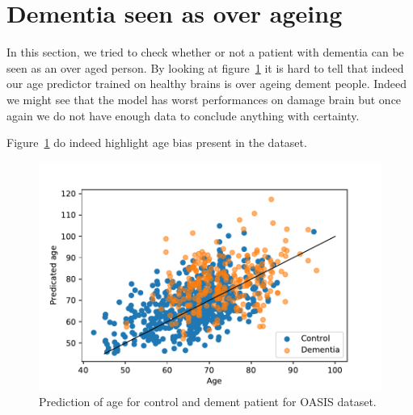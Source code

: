 \section{Dementia seen as over ageing}
In this section, we tried to check whether or not a patient with dementia can be seen as an over aged person. By looking at figure~\ref{fig:dem_vs_control_age_pred} it is hard to tell that indeed our age predictor trained on healthy brains is over ageing dement people. Indeed we might see that the model has worst performances on damage brain but once again we do not have enough data to conclude anything with certainty. 

Figure~\ref{fig:dem_vs_control_age_pred} do indeed highlight age bias present in the dataset. 
\begin{figure}
 \centering
 \includegraphics[width=.9\linewidth]{figures/Experiements/dem_vs_cont_age_pred.pdf}
 \captionsetup{width=.9\linewidth}
 \caption{Prediction of age for control and dement patient for OASIS dataset.}
 \label{fig:dem_vs_control_age_pred}
\end{figure}
